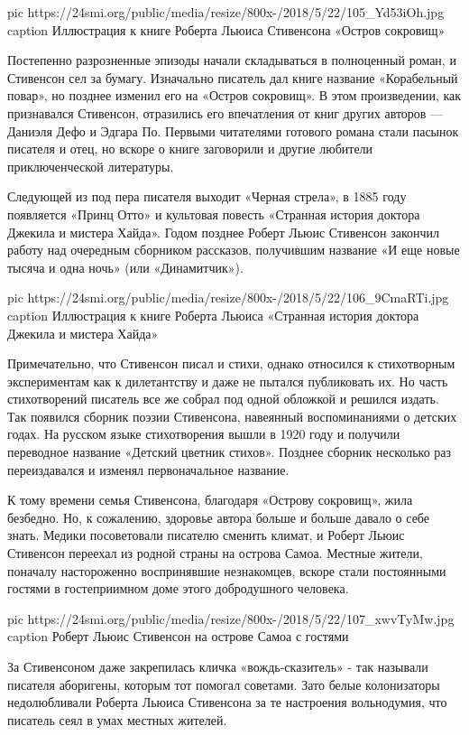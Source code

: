 \ifcmt
pic https://24smi.org/public/media/resize/800x-/2018/5/22/105_Yd53iOh.jpg
caption Иллюстрация к книге Роберта Льюиса Стивенсона «Остров сокровищ»
\fi

Постепенно разрозненные эпизоды начали складываться в полноценный роман, и
Стивенсон сел за бумагу. Изначально писатель дал книге название
«Корабельный повар», но позднее изменил его на «Остров сокровищ». В этом
произведении, как признавался Стивенсон, отразились его впечатления от
книг других авторов --- Даниэля Дефо и Эдгара По. Первыми читателями
готового романа стали пасынок писателя и отец, но вскоре о книге
заговорили и другие любители приключенческой литературы.

Следующей из под пера писателя выходит «Черная стрела», в 1885 году
появляется «Принц Отто» и культовая повесть «Странная история доктора
Джекила и мистера Хайда». Годом позднее Роберт Льюис Стивенсон закончил
работу над очередным сборником рассказов, получившим название «И еще новые
тысяча и одна ночь» (или «Динамитчик»).

\ifcmt
pic https://24smi.org/public/media/resize/800x-/2018/5/22/106_9CmaRTi.jpg
caption Иллюстрация к книге Роберта Льюиса «Странная история доктора Джекила и мистера Хайда»
\fi


Примечательно, что Стивенсон писал и стихи, однако относился к стихотворным
экспериментам как к дилетантству и даже не пытался публиковать их. Но часть
стихотворений писатель все же собрал под одной обложкой и решился издать. Так
появился сборник поэзии Стивенсона, навеянный воспоминаниями о детских годах.
На русском языке стихотворения вышли в 1920 году и получили переводное название
«Детский цветник стихов».  Позднее сборник несколько раз переиздавался и
изменял первоначальное название.

К тому времени семья Стивенсона, благодаря «Острову сокровищ», жила безбедно.
Но, к сожалению, здоровье автора больше и больше давало о себе знать. Медики
посоветовали писателю сменить климат, и Роберт Льюис Стивенсон переехал из
родной страны на острова Самоа. Местные жители, поначалу настороженно
воспринявшие незнакомцев, вскоре стали постоянными гостями в гостеприимном доме
этого добродушного человека.

\ifcmt
pic https://24smi.org/public/media/resize/800x-/2018/5/22/107_xwvTyMw.jpg
caption Роберт Льюис Стивенсон на острове Самоа с гостями
\fi

За Стивенсоном даже закрепилась кличка «вождь-сказитель» - так называли
писателя аборигены, которым тот помогал советами. Зато белые колонизаторы
недолюбливали Роберта Льюиса Стивенсона за те настроения вольнодумия, что
писатель сеял в умах местных жителей.

